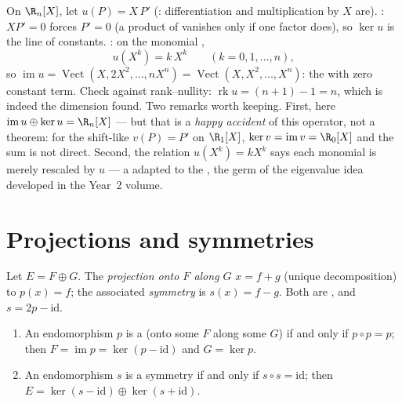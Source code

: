 \begin{example}
\label{ex:b1:linmaps:euler}
On $\R_n[X]$, let $u(P) = X\,P'$ (: differentiation and
multiplication by $X$ are). \emph{}: $XP' = 0$ forces $P' =
0$ (a product of  vanishes only if one factor does),
so $\ker u$ is the line of constants. \emph{}: on the
monomial ,
\[
u(X^k) = k\,X^{k} \qquad (k = 0, 1, \dots, n),
\]
so $\operatorname{im} u = \operatorname{Vect}(X, 2X^2, \dots,
nX^n) = \operatorname{Vect}(X, X^2, \dots, X^n)$: the
 with zero constant term. Check against rank--nullity:
$\operatorname{rk} u = (n + 1) - 1 = n$, which is indeed the
dimension found. Two remarks worth keeping. First, here
$\operatorname{im} u \oplus \ker u = \R_n[X]$ --- but that is a
\emph{happy accident} of this operator, not a theorem: for the
shift-like $v(P) = P'$ on $\R_1[X]$, $\ker v = \operatorname{im}
v = \R_0[X]$ and the sum is not direct. Second, the relation
$u(X^k) = kX^k$ says each monomial is merely rescaled by $u$ ---
a  adapted to the , the germ of the eigenvalue idea
developed in the Year~2 volume.
\end{example}

\section{Projections and symmetries}

\begin{definition}\label{def:b1:linmaps:projection}
Let $E = F \oplus G$. The \emph{projection onto $F$ along
$G$}  $x = f + g$ (unique decomposition) to
$p(x) = f$; the associated \emph{symmetry} is $s(x)
= f - g$. Both are , and $s = 2p - \mathrm{id}$.
\end{definition}

\begin{theorem}\label{thm:b1:linmaps:projchar}
\begin{enumerate}
  \item An endomorphism $p$ is a  (onto some $F$ along
        some $G$) if and only if $p \circ p = p$; then $F =
        \operatorname{im} p = \ker(p - \mathrm{id})$ and $G = \ker
        p$.
  \item An endomorphism $s$ is a symmetry if and only if $s \circ s
        = \mathrm{id}$; then $E = \ker(s - \mathrm{id}) \oplus
        \ker(s + \mathrm{id})$.
\end{enumerate}
\end{theorem}

